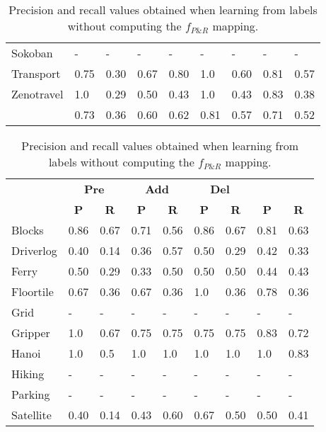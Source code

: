 \documentclass{article}
\begin{document}
\begin{table}
\begin{center}
\begin{scriptsize}
\begin{tabular}{l|l|l|l|l|l|l||l|l|}
					Sokoban & - & - & - & - & - & - & - & - \\ %
					Transport & 0.75 & 0.30 & 0.67 & 0.80 & 1.0 & 0.60 & 0.81 & 0.57 \\
					Zenotravel & 1.0 & 0.29 & 0.50 & 0.43 & 1.0 & 0.43 & 0.83 & 0.38 \\
					\hline
					\bf  & 0.73 & 0.36 & 0.60 & 0.62 & 0.81 & 0.57 & 0.71 & 0.52 \\
				\end{tabular}
	\end{scriptsize}
		\end{center}
 \caption{\small Precision and recall values obtained when learning from labels without computing the $f_{P\&R}$ mapping.}
\label{fig:labelsnomap}                

\begin{center}
\begin{scriptsize}                
				\begin{tabular}{l|l|l|l|l|l|l||l|l|}
					& \multicolumn{2}{|c|}{\bf Pre} & \multicolumn{2}{|c|}{\bf Add} & \multicolumn{2}{|c||}{\bf Del} & \multicolumn{2}{|c}{\bf}\\ \cline{2-9}			
					& \multicolumn{1}{|c|}{\bf P} & \multicolumn{1}{|c|}{\bf R} & \multicolumn{1}{|c|}{\bf P} & \multicolumn{1}{|c|}{\bf R} & \multicolumn{1}{|c|}{\bf P} & \multicolumn{1}{|c||}{\bf R} &  \multicolumn{1}{|c|}{\bf P} & \multicolumn{1}{|c|}{\bf R} \\
					\hline
					Blocks & 0.86 & 0.67 & 0.71 & 0.56 & 0.86 & 0.67 & 0.81 & 0.63 \\
					Driverlog & 0.40 & 0.14 & 0.36 & 0.57 & 0.50 & 0.29 & 0.42 & 0.33 \\
					Ferry & 0.50 & 0.29 & 0.33 & 0.50 & 0.50 & 0.50 & 0.44 & 0.43 \\
					Floortile & 0.67 & 0.36 & 0.67 & 0.36 & 1.0 & 0.36 & 0.78 & 0.36 \\
					Grid & - & - & - & - & - & - & - & - \\ %
					Gripper & 1.0 & 0.67 & 0.75 & 0.75 & 0.75 & 0.75 & 0.83 & 0.72 \\
					Hanoi & 1.0 & 0.5 & 1.0 & 1.0 & 1.0 & 1.0 & 1.0 & 0.83 \\
					Hiking & - & - & - & - & - & - & - & - \\ %
					Parking & - & - & - & - & - & - & - & - \\ %
					Satellite & 0.40 & 0.14 & 0.43 & 0.60 & 0.67 & 0.50 & 0.50 & 0.41 \\

\end{tabular}
\end{scriptsize}
\end{center}
\end{table}
\end{document}
